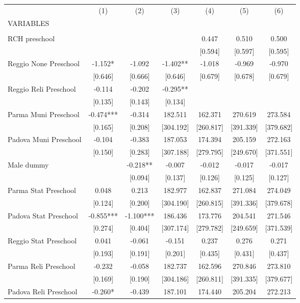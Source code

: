 \begin{tabular}{lcccccc} \hline
 & (1) & (2) & (3) & (4) & (5) & (6) \\
VARIABLES &  &  &  &  &  &  \\ \hline
 &  &  &  &  &  &  \\
RCH preschool &  &  &  & 0.447 & 0.510 & 0.500 \\
 &  &  &  & [0.594] & [0.597] & [0.595] \\
Reggio None Preschool & -1.152* & -1.092 & -1.402** & -1.018 & -0.969 & -0.970 \\
 & [0.646] & [0.666] & [0.646] & [0.679] & [0.678] & [0.679] \\
Reggio Reli Preschool & -0.114 & -0.202 & -0.295** &  &  &  \\
 & [0.135] & [0.143] & [0.134] &  &  &  \\
Parma Muni Preschool & -0.474*** & -0.314 & 182.511 & 162.371 & 270.619 & 273.584 \\
 & [0.165] & [0.208] & [304.192] & [260.817] & [391.339] & [379.682] \\
Padova Muni Preschool & -0.104 & -0.383 & 187.053 & 174.394 & 205.159 & 272.163 \\
 & [0.150] & [0.283] & [307.188] & [279.795] & [249.670] & [371.551] \\
Male dummy &  & -0.218** & -0.007 & -0.012 & -0.017 & -0.017 \\
 &  & [0.094] & [0.137] & [0.126] & [0.125] & [0.127] \\
Parma Stat Preschool & 0.048 & 0.213 & 182.977 & 162.837 & 271.084 & 274.049 \\
 & [0.124] & [0.200] & [304.190] & [260.815] & [391.336] & [379.678] \\
Padova Stat Preschool & -0.855*** & -1.100*** & 186.436 & 173.776 & 204.541 & 271.546 \\
 & [0.274] & [0.404] & [307.174] & [279.782] & [249.659] & [371.539] \\
Reggio Stat Preschool & 0.041 & -0.061 & -0.151 & 0.237 & 0.276 & 0.271 \\
 & [0.193] & [0.191] & [0.201] & [0.435] & [0.431] & [0.437] \\
Parma Reli Preschool & -0.232 & -0.058 & 182.737 & 162.596 & 270.846 & 273.810 \\
 & [0.169] & [0.190] & [304.186] & [260.811] & [391.335] & [379.677] \\
Padova Reli Preschool & -0.260* & -0.439 & 187.101 & 174.440 & 205.204 & 272.213 \\

\end{tabular}
